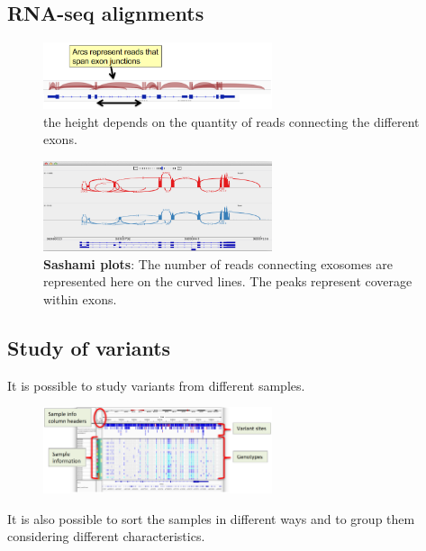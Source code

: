 \subsection*{RNA-seq alignments}

\begin{figure}[H]
    \caption{the height depends on the quantity of reads connecting the different exons.}
    \centering
    \includegraphics[width=0.6\textwidth]{RNAseqAlign.PNG}
\end{figure}

\begin{figure}[H]
    \caption{\textbf{Sashami plots}: The number of reads connecting exosomes are
    represented here on the curved lines. The peaks represent coverage within
    exons.}
    \centering
    \includegraphics[width=0.6\textwidth]{sashamiplot.PNG}
\end{figure}

\subsection*{Study of variants}
It is possible to study variants from different samples.

\begin{figure}[H]
    \centering
    \includegraphics[width=0.6\textwidth]{variantsView.PNG}
\end{figure}

It is also possible to sort the samples in different ways and to group them considering different characteristics.




